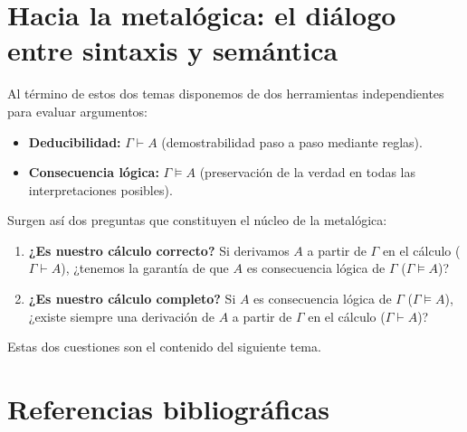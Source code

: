 \section{Hacia la metalógica: el diálogo entre sintaxis y semántica}

Al término de estos dos temas disponemos de dos herramientas independientes para evaluar argumentos:
\begin{itemize}
    \item \textbf{Deducibilidad:} $\Gamma \vdash A$ (demostrabilidad paso a paso mediante reglas).
    \item \textbf{Consecuencia lógica:} $\Gamma \models
      A$ (preservación de la verdad en todas las interpretaciones posibles).
\end{itemize}

Surgen así dos preguntas que constituyen el núcleo de la metalógica:
\begin{enumerate}
    \item \textbf{¿Es nuestro cálculo correcto?} Si derivamos $A$ a partir de $\Gamma$ en el cálculo ($\Gamma \vdash A$), ¿tenemos la garantía de que $A$ es consecuencia lógica de $\Gamma$ ($\Gamma \models A$)?
    \item \textbf{¿Es nuestro cálculo completo?} Si $A$ es consecuencia lógica de $\Gamma$ ($\Gamma \models A$), ¿existe siempre una derivación de $A$ a partir de $\Gamma$ en el cálculo ($\Gamma \vdash A$)?
\end{enumerate}
Estas dos cuestiones son el contenido del
siguiente tema.

\section*{Referencias bibliográficas}

